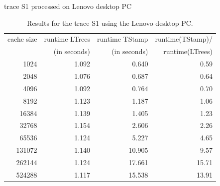 \documentclass[a4paper,12pt, titlepage]{article}  %
\begin{document}
\begin{table}[p]
\begin{center}
	trace S1 processed on Lenovo desktop PC
	\begin{tabular}{|r||r|r|r|}
	  	\hline
                cache size                               &     runtime LTrees         &      runtime TStamp          &  runtime(TStamp)/ \\
                                                             &      (in seconds)            &      (in seconds)                 & runtime(LTrees)     \\
                \hline
                1024			             &            1.092                  &            0.640                        &         0.59               \\
		2048					     &         1.076                     &    0.687                                &     0.64                   \\								
		4096					     &         1.092                     &     0.764                               &     0.70                   \\	
		8192					     &         1.123                     &     1.187                               &     1.06                   \\	
		16384				     &         1.139                     &     1.405                               &     1.23                   \\	
		32768				     &         1.154                     &     2.606                               &     2.26                   \\	
		65536				     &         1.124                     &     5.227                               &     4.65                   \\	
		131072				     &         1.140                     &      10.905                              &     9.57                   \\	
		262144				     &         1.124                     &    17.661                                &   15.71                     \\	
		524288				     &         1.117                     &     15.538                               &   13.91                     \\
                \hline
	\end{tabular}
	\caption{Results for the trace S1 using the Lenovo desktop PC.}
        \label{tab:lenovo_S1}
\end{center}
\end{table}
\end{document}
